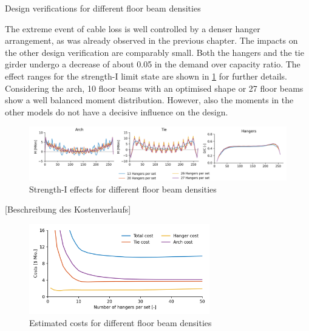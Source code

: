\begin{table}[H]
    \centering
    \resizebox{\columnwidth}{!}{%
    
    }
    \caption{Design verifications for different floor beam densities}
    \label{tab:fb_dc}
\end{table}

The extreme event of cable loss is well controlled by a denser hanger arrangement, as was already observed in the previous chapter. The impacts on the other design verification are comparably small. Both the hangers and the tie girder undergo a decrease of about 0.05 in the demand over capacity ratio. The effect ranges for the strength-I limit state are shown in \cref{fig:fb_strength} for further details. Considering the arch, 10 floor beams with an optimised shape or 27 floor beams show a well balanced moment distribution. However, also the moments in the other models do not have a decisive influence on the design.

\begin{figure}[H]
    \centering
    \includegraphics[trim={0 0 1cm 0},clip, width=\textwidth]{calculations/hanger density/dead loading_plot.png}
    \caption{Strength-I effects for different floor beam densities}
    \label{fig:fb_strength}
\end{figure}


[Beschreibung des Kostenverlaufs]

\begin{figure}[H]
    \centering
    \includegraphics[width=0.7\textwidth]{calculations/floor beam comparison/cost comparison.png}
    \caption{Estimated costs for different floor beam densities}
    \label{fig:fb_costs}
\end{figure}


